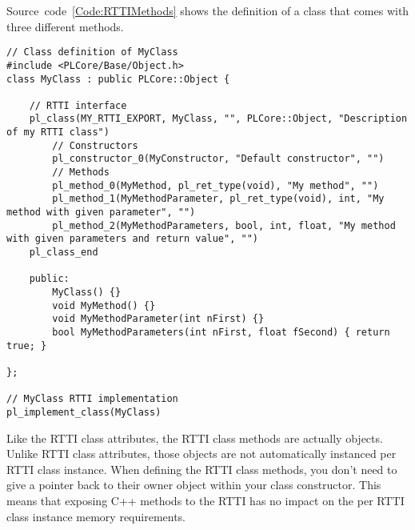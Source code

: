 Source~code~\ref{Code:RTTIMethods} shows the definition of a class that comes with three different methods.
\begin{lstlisting}[label=Code:RTTIMethods,caption={Definition of RTTI class methods with parameters}]
// Class definition of MyClass
#include <PLCore/Base/Object.h>
class MyClass : public PLCore::Object {

	// RTTI interface
	pl_class(MY_RTTI_EXPORT, MyClass, "", PLCore::Object, "Description of my RTTI class")
		// Constructors
		pl_constructor_0(MyConstructor, "Default constructor", "")
		// Methods
		pl_method_0(MyMethod, pl_ret_type(void), "My method", "")
		pl_method_1(MyMethodParameter, pl_ret_type(void), int, "My method with given parameter", "")
		pl_method_2(MyMethodParameters, bool, int, float, "My method with given parameters and return value", "")
	pl_class_end

	public:
		MyClass() {}
		void MyMethod() {}
		void MyMethodParameter(int nFirst) {}
		bool MyMethodParameters(int nFirst, float fSecond) { return true; }

};

// MyClass RTTI implementation
pl_implement_class(MyClass)
\end{lstlisting}
Like the RTTI class attributes, the RTTI class methods are actually objects. Unlike RTTI class attributes, those objects are not automatically instanced per RTTI class instance. When defining the RTTI class methods, you don't need to give a pointer back to their owner object within your class constructor. This means that exposing C++ methods to the RTTI has no impact on the per RTTI class instance memory requirements.


